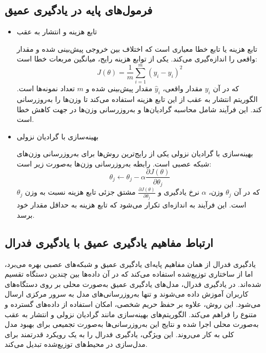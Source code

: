 \subsection{فرمول‌های پایه در یادگیری عمیق}
\begin{itemize}
\item تابع هزینه و انتشار به عقب

تابع هزینه یا تابع خطا معیاری است که اختلاف بین خروجی پیش‌بینی شده و مقدار واقعی را اندازه‌گیری می‌کند. یکی از توابع هزینه رایج، میانگین مربعات خطا%
است:
\begin{equation}
	J(\theta) = \frac{1}{m} \sum_{i=1}^{m} (y_i - \hat{y}_i)^2
\end{equation}
که در آن
$y_i$
مقدار واقعی،
$\hat{y}_i$
مقدار پیش‌بینی شده و
$m$
تعداد نمونه‌ها است. الگوریتم انتشار به عقب از این تابع هزینه استفاده می‌کند تا وزن‌ها را به‌روزرسانی کند. این فرآیند شامل محاسبه گرادیان‌ها و به‌روزرسانی وزن‌ها در جهت کاهش خطا است.


\item بهینه‌سازی با گرادیان نزولی

بهینه‌سازی با گرادیان نزولی یکی از رایج‌ترین روش‌ها برای به‌روزرسانی وزن‌های شبکه عصبی است. رابطه به‌روزرسانی وزن‌ها به‌صورت زیر است:
\begin{equation}
	\theta_{j} \leftarrow \theta_{j} - \alpha \frac{\partial J(\theta)}{\partial \theta_{j}}
\end{equation}
که در آن
$\theta_{j}$
وزن،
$\alpha$
نرخ یادگیری و
$\frac{\partial J(\theta)}{\partial \theta_{j}}$
مشتق جزئی تابع هزینه نسبت به وزن
$\theta_{j}$
است. این فرآیند به اندازه‌ای تکرار می‌شود که تابع هزینه به حداقل مقدار خود برسد.
\end{itemize}


\subsection{ارتباط مفاهیم یادگیری عمیق با یادگیری فدرال}
یادگیری فدرال از همان مفاهیم پایه‌ای یادگیری عمیق و شبکه‌های عصبی بهره می‌برد، اما از ساختاری توزیع‌شده استفاده می‌کند که در آن داده‌ها بین چندین دستگاه تقسیم شده‌اند. در یادگیری فدرال، مدل‌های یادگیری عمیق به‌صورت محلی بر روی دستگاه‌های کاربران آموزش داده می‌شوند و تنها به‌روزرسانی‌های مدل به سرور مرکزی ارسال می‌شود. این روش، علاوه بر حفظ حریم شخصی، امکان استفاده از داده‌های گسترده و متنوع را فراهم می‌کند. الگوریتم‌های بهینه‌سازی مانند گرادیان نزولی و انتشار به عقب به‌صورت محلی اجرا شده و نتایج این به‌روزرسانی‌ها به‌صورت تجمیعی برای بهبود مدل کلی به کار می‌روند. این ویژگی، یادگیری فدرال را به یک رویکرد قدرتمند برای مدل‌سازی در محیط‌های توزیع‌شده تبدیل می‌کند.



